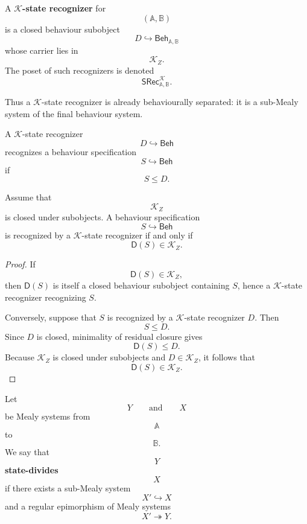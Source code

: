 \begin{definition}
\label{def:eilenberg-K-state-recognizer}
A \textbf{\(\mathcal K\)-state recognizer} for
\[
(\mathbb A,\mathbb B)
\]
is a closed behaviour subobject
\[
D\hookrightarrow\mathsf{Beh}_{\mathbb A,\mathbb B}
\]
whose carrier lies in
\[
\mathcal K_Z.
\]
The poset of such recognizers is denoted
\[
\mathsf{SRec}^{\mathcal K}_{\mathbb A,\mathbb B}.
\]
\end{definition}

Thus a \(\mathcal K\)-state recognizer is already behaviourally separated:
it is a sub-Mealy system of the final behaviour system.

\begin{definition}
\label{def:eilenberg-recognition-by-state-recognizer}
A \(\mathcal K\)-state recognizer
\[
D\hookrightarrow\mathsf{Beh}
\]
recognizes a behaviour specification
\[
S\hookrightarrow\mathsf{Beh}
\]
if
\[
S\leq D.
\]
\end{definition}

\begin{proposition}
\label{prop:eilenberg-state-recognizability-criterion}
Assume that
\[
\mathcal K_Z
\]
is closed under subobjects. A behaviour specification
\[
S\hookrightarrow\mathsf{Beh}
\]
is recognized by a \(\mathcal K\)-state recognizer if and only if
\[
\mathsf D(S)\in\mathcal K_Z.
\]
\end{proposition}

\begin{proof}
If
\[
\mathsf D(S)\in\mathcal K_Z,
\]
then \(\mathsf D(S)\) is itself a closed behaviour subobject containing
\(S\), hence a \(\mathcal K\)-state recognizer recognizing \(S\).

Conversely, suppose that \(S\) is recognized by a \(\mathcal K\)-state
recognizer \(D\). Then
\[
S\leq D.
\]
Since \(D\) is closed, minimality of residual closure gives
\[
\mathsf D(S)\leq D.
\]
Because \(\mathcal K_Z\) is closed under subobjects and \(D\in\mathcal K_Z\),
it follows that
\[
\mathsf D(S)\in\mathcal K_Z.
\]
\end{proof}

\begin{definition}
\label{def:eilenberg-state-divisibility}
Let
\[
Y
\qquad\text{and}\qquad
X
\]
be Mealy systems from
\[
\mathbb A
\]
to
\[
\mathbb B.
\]
We say that
\[
Y
\]
\textbf{state-divides}
\[
X
\]
if there exists a sub-Mealy system
\[
X'\hookrightarrow X
\]
and a regular epimorphism of Mealy systems
\[
X'\twoheadrightarrow Y.
\]
\end{definition}

